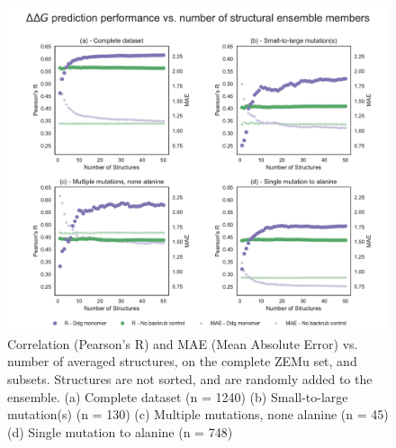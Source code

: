 \begin{figure}
  \includegraphics[width=\textwidth,keepaspectratio]{structs-v-corr-id-ddg-monomer-16-003-zemu-2.pdf}
  \caption[]{ %
    Correlation (Pearson's R) and MAE (Mean Absolute Error) vs. number of averaged structures, on the complete ZEMu set, and subsets. Structures are not sorted, and are randomly added to the ensemble. 
    (a) Complete dataset (n = 1240)
    (b) Small-to-large mutation(s) (n = 130)
    (c) Multiple mutations, none alanine (n = 45)
    (d) Single mutation to alanine (n = 748)
  } \label{fig:structs-v-corr-id-ddg-monomer-16-003-zemu-2}
\end{figure}
